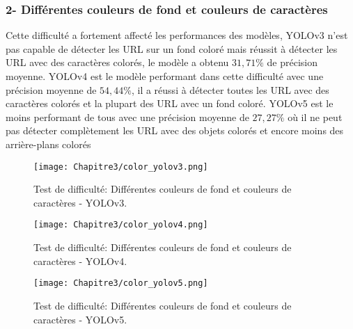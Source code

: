           \subsubsection{2- Différentes couleurs de fond et couleurs de caractères}
          Cette difficulté a fortement affecté les performances des modèles,
          YOLOv3 n'est pas capable de détecter les URL sur un fond coloré mais réussit à détecter les URL avec des caractères colorés, le modèle a obtenu $31,71\%$ de précision moyenne.
          YOLOv4 est le modèle performant dans cette difficulté avec une précision moyenne de $54,44\%$, il a réussi à détecter toutes les URL avec des caractères colorés et la plupart des URL avec un fond coloré.
          YOLOv5 est le moins performant de tous avec une précision moyenne de $27,27\%$ où il ne peut pas détecter complètement les URL avec des objets colorés et encore moins des arrière-plans colorés
          \begin{figure}[H]
               \centering
                \texttt{[image: Chapitre3/color\_yolov3.png]}
                \caption{Test de difficulté: Différentes couleurs de fond et couleurs de caractères - YOLOv3.}
                \label{y3_t3}
                \end{figure}
          \begin{figure}[H]
                    \centering
                    \texttt{[image: Chapitre3/color\_yolov4.png]}
                    \caption{Test de difficulté: Différentes couleurs de fond et couleurs de caractères - YOLOv4.}
                    \label{y4_t3}
                    \end{figure}
          \begin{figure}[H]
                    \centering
                    \texttt{[image: Chapitre3/color\_yolov5.png]}
                    \caption{Test de difficulté: Différentes couleurs de fond et couleurs de caractères - YOLOv5.}
                    \label{y5_t3}
                    \end{figure}
          
